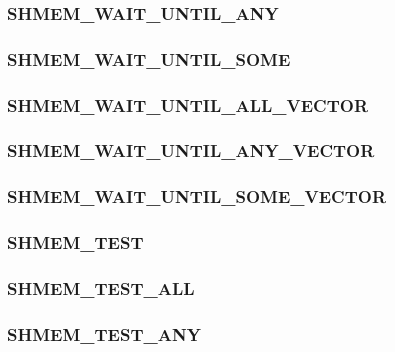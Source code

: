 \documentclass[10pt,oneside]{book}
\begin{document}
\subsubsection{\textbf{SHMEM\_WAIT\_UNTIL\_ANY}}\label{subsec:shmem_wait_until_any}


\subsubsection{\textbf{SHMEM\_WAIT\_UNTIL\_SOME}}\label{subsec:shmem_wait_until_some}


\subsubsection{\textbf{SHMEM\_WAIT\_UNTIL\_ALL\_VECTOR}}\label{subsec:shmem_wait_until_all_vector}


\subsubsection{\textbf{SHMEM\_WAIT\_UNTIL\_ANY\_VECTOR}}\label{subsec:shmem_wait_until_any_vector}


\subsubsection{\textbf{SHMEM\_WAIT\_UNTIL\_SOME\_VECTOR}}\label{subsec:shmem_wait_until_some_vector}


\subsubsection{\textbf{SHMEM\_TEST}}\label{subsec:shmem_test}


\subsubsection{\textbf{SHMEM\_TEST\_ALL}}\label{subsec:shmem_test_all}


\subsubsection{\textbf{SHMEM\_TEST\_ANY}}\label{subsec:shmem_test_any}

\end{document}
